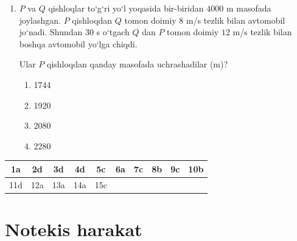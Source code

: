\begin{enumerate}
\begin{enumerate}[label=\Alph*)]
\end{enumerate}


\item $P$ va $Q$ qishloqlar to‘g‘ri yo‘l yoqasida
bir-biridan $4000$ m masofada joylashgan. $P$ qishloqdan $Q$ tomon doimiy $8$ m/s tezlik bilan
avtomobil jo‘nadi. Shundan $30$ s o‘tgach $Q$ dan
$P$ tomon doimiy $12$ m/s tezlik bilan boshqa
avtomobil yo‘lga chiqdi.

Ular $P$ qishloqdan qanday masofada uchrashadilar (m)?

\begin{enumerate}[label=\Alph*)]
\item 1744
\item 1920
\item 2080
\item 2280

\end{enumerate}

\end{enumerate}

\begin{table}[h!]
\centering
\begin{tabular}{|c|c|c|c|c|c|c|c|c|c|}
\hline
1a & 2d & 3d & 4d & 5c & 6a & 7c & 8b & 9c & 10b \\ \hline
11d & 12a & 13a & 14a & 15c &  &  &  &  &  \\ \hline
\end{tabular}
\end{table}










\section{Notekis harakat}


